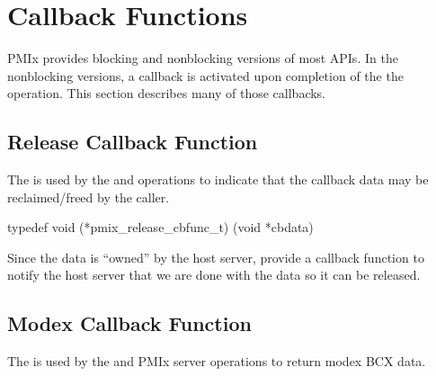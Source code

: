 %


\section{Callback Functions}

PMIx provides blocking and nonblocking versions of most APIs.
In the nonblocking versions, a callback is activated upon completion of the the operation.
This section describes many of those callbacks.


\subsection{Release Callback Function}

\summary

The  is used by the  and  operations to indicate that the callback data may be reclaimed/freed by the caller.

\format

\cspecificstart
\begin{codepar}
typedef void (*pmix_release_cbfunc_t)
    (void *cbdata)
\end{codepar}
\cspecificend

\begin{arglist}
\end{arglist}

\descr

Since the data is ``owned'' by the host server, provide a callback function to notify the host server that we are done with the data so it can be released.


\subsection{Modex Callback Function}

\summary

The  is used by the  and  PMIx server operations to return modex \ac{BCX} data.

